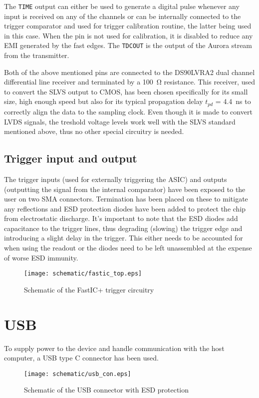 The \verb|TIME| output can either be used to generate a digital pulse whenever any input is received on any of the channels or can be internally connected to the trigger comparator and used for trigger calibration routine, the latter being used in this case. When the pin is not used for calibration, it is disabled to reduce any EMI generated by the fast edges. The \verb|TDCOUT| is the output of the Aurora stream from the transmitter.

Both of the above mentioned pins are connected to the DS90LVRA2 dual channel differential line receiver and terminated by a \SI{100}{\ohm} resistance. This receiver, used to convert the SLVS output to CMOS, has been chosen specifically for its small size, high enough speed but also for its typical propagation delay $t_{pd}$ = \SI{4.4}{\nano\second} to correctly align the data to the sampling clock. Even though it is made to convert LVDS signals, the treshold voltage levels work well with the SLVS standard mentioned above, thus no other special circuitry is needed. 

\subsection{Trigger input and output}
The trigger inputs (used for externally triggering the ASIC) and outputs (outputting the signal from the internal comparator) have been exposed to the user on two SMA connectors. Termination has been placed on these to mitigate any reflections and ESD protection diodes have been added to protect the chip from electrostatic discharge. It's important to note that the ESD diodes add capacitance to the trigger lines, thus degrading (slowing) the trigger edge and introducing a slight delay in the trigger. This either needs to be accounted for when using the readout or the diodes need to be left unassembled at the expense of worse ESD immunity. 
%
\FloatBarrier
\begin{figure}[htp!]
    \centering
    \texttt{[image: schematic/fastic\_top.eps]}
    \caption{Schematic of the FastIC+ trigger circuitry}
    \label{fig:schem_fastic_triggers}
\end{figure}
\FloatBarrier

\section{USB}
To supply power to the device and handle communication with the host computer, a USB type C connector has been used.
\FloatBarrier
\begin{figure}[htp!]
    \centering
    \texttt{[image: schematic/usb\_con.eps]}
    \caption{Schematic of the USB connector with ESD protection}
    \label{fig:schem_usb_con}
\end{figure}
\FloatBarrier
